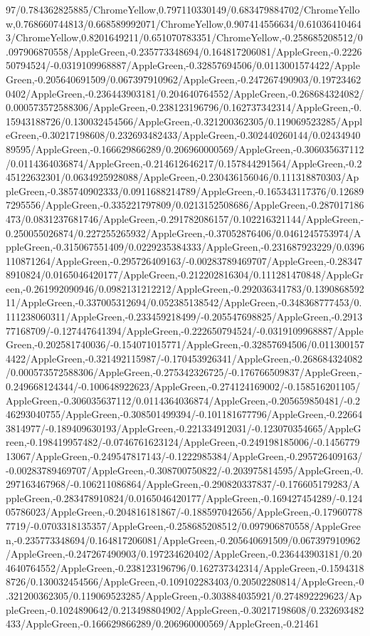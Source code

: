 {\begin{tikzternal}
{97/0.784362825885/ChromeYellow,0.797110330149/0.683479884702/ChromeYellow,0.768660744813/0.668589992071/ChromeYellow,0.907414556634/0.610364104643/ChromeYellow,0.8201649211/0.651070783351/ChromeYellow,-0.258685208512/0.097906870558/AppleGreen,-0.235773348694/0.164817206081/AppleGreen,-0.222650794524/-0.0319109968887/AppleGreen,-0.32857694506/0.0113001574422/AppleGreen,-0.205640691509/0.067397910962/AppleGreen,-0.247267490903/0.197234620402/AppleGreen,-0.236443903181/0.204640764552/AppleGreen,-0.268684324082/0.000573572588306/AppleGreen,-0.238123196796/0.162737342314/AppleGreen,-0.15943188726/0.130032454566/AppleGreen,-0.321200362305/0.119069523285/AppleGreen,-0.30217198608/0.232693482433/AppleGreen,-0.302440260144/0.0243494089595/AppleGreen,-0.166629866289/0.206960000569/AppleGreen,-0.306035637112/0.0114364036874/AppleGreen,-0.214612646217/0.157844291564/AppleGreen,-0.245122632301/0.0634925928088/AppleGreen,-0.230436156046/0.111318870303/AppleGreen,-0.385740902333/0.0911688214789/AppleGreen,-0.165343117376/0.126897295556/AppleGreen,-0.335221797809/0.0213152508686/AppleGreen,-0.287017186473/0.0831237681746/AppleGreen,-0.291782086157/0.102216321144/AppleGreen,-0.250055026874/0.227255265932/AppleGreen,-0.37052876406/0.0461245753974/AppleGreen,-0.315067551409/0.0229235384333/AppleGreen,-0.231687923229/0.0396110871264/AppleGreen,-0.295726409163/-0.00283789469707/AppleGreen,-0.283478910824/0.0165046420177/AppleGreen,-0.212202816304/0.111281470848/AppleGreen,-0.261992090946/0.0982131212212/AppleGreen,-0.292036341783/0.139086859211/AppleGreen,-0.337005312694/0.052385138542/AppleGreen,-0.348368777453/0.111238060311/AppleGreen,-0.233459218499/-0.205547698825/AppleGreen,-0.291377168709/-0.127447641394/AppleGreen,-0.222650794524/-0.0319109968887/AppleGreen,-0.202581740036/-0.154071015771/AppleGreen,-0.32857694506/0.0113001574422/AppleGreen,-0.321492115987/-0.170453926341/AppleGreen,-0.268684324082/0.000573572588306/AppleGreen,-0.275342326725/-0.176766509837/AppleGreen,-0.249668124344/-0.100648922623/AppleGreen,-0.274124169002/-0.158516201105/AppleGreen,-0.306035637112/0.0114364036874/AppleGreen,-0.205659850481/-0.246293040755/AppleGreen,-0.308501499394/-0.101181677796/AppleGreen,-0.226643814977/-0.189409630193/AppleGreen,-0.221334912031/-0.123070354665/AppleGreen,-0.198419957482/-0.0746761623124/AppleGreen,-0.249198185006/-0.145677913067/AppleGreen,-0.249547817143/-0.1222985384/AppleGreen,-0.295726409163/-0.00283789469707/AppleGreen,-0.308700750822/-0.203975814595/AppleGreen,-0.297163467968/-0.106211086864/AppleGreen,-0.290820337837/-0.176605179283/AppleGreen,-0.283478910824/0.0165046420177/AppleGreen,-0.169427454289/-0.12405786023/AppleGreen,-0.204816181867/-0.188597042656/AppleGreen,-0.179607787719/-0.0703318135357/AppleGreen,-0.258685208512/0.097906870558/AppleGreen,-0.235773348694/0.164817206081/AppleGreen,-0.205640691509/0.067397910962/AppleGreen,-0.247267490903/0.197234620402/AppleGreen,-0.236443903181/0.204640764552/AppleGreen,-0.238123196796/0.162737342314/AppleGreen,-0.15943188726/0.130032454566/AppleGreen,-0.109102283403/0.20502280814/AppleGreen,-0.321200362305/0.119069523285/AppleGreen,-0.303884035921/0.274892229623/AppleGreen,-0.1024890642/0.213498804902/AppleGreen,-0.30217198608/0.232693482433/AppleGreen,-0.166629866289/0.206960000569/AppleGreen,-0.21461}
\end{tikzternal}}
